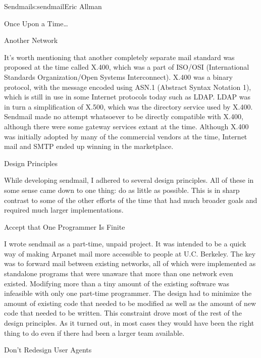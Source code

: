 \begin{aosachapter}{Sendmail}{s:sendmail}{Eric Allman}
\begin{aosasect1}{Once Upon a Time\ldots}
\begin{aosabox}{Another Network}

It's worth mentioning that another completely separate
mail standard was proposed at the
time called X.400, which was a part of ISO/OSI (International
Standards Organization/Open Systems Interconnect).  X.400 was a binary
protocol, with the message encoded using ASN.1 (Abstract Syntax
Notation 1), which is still in use in some Internet protocols today
such as LDAP\@. LDAP was in turn a simplification of X.500, which was
the directory service used by X.400.  Sendmail made no attempt
whatsoever to be directly compatible with X.400, although there were
some gateway services extant at the time. Although X.400 was initially
adopted by many of the commercial vendors at the time, Internet mail
and SMTP
ended up winning in the marketplace.

\end{aosabox}

\end{aosasect1}

\begin{aosasect1}{Design Principles}

While developing sendmail, I adhered to several design principles. All
of these in some sense came down to one thing: do as little as
possible.  This is in sharp contrast to some of the other efforts of
the time that had much broader goals and required much larger
implementations.

\begin{aosasect2}{Accept that One Programmer Is Finite}

I wrote sendmail as a part-time, unpaid project. It was intended to be
a quick way of making Arpanet mail more accessible to people at
U.C. Berkeley. The key was to forward mail between existing networks,
all of which were implemented as standalone programs that were unaware
that more than one network even existed. Modifying more than a tiny
amount of the existing software was infeasible with only one part-time
programmer.  The design had to minimize the amount of existing code
that needed to be modified as well as the amount of new code that
needed to be written.  This constraint drove most of the rest of the
design principles. As it turned out, in most cases they would have
been the right thing to do even if there had been a larger team
available.

\end{aosasect2}

\begin{aosasect2}{Don't Redesign User Agents}


\end{aosasect2}
\end{aosasect1}
\end{aosachapter}
